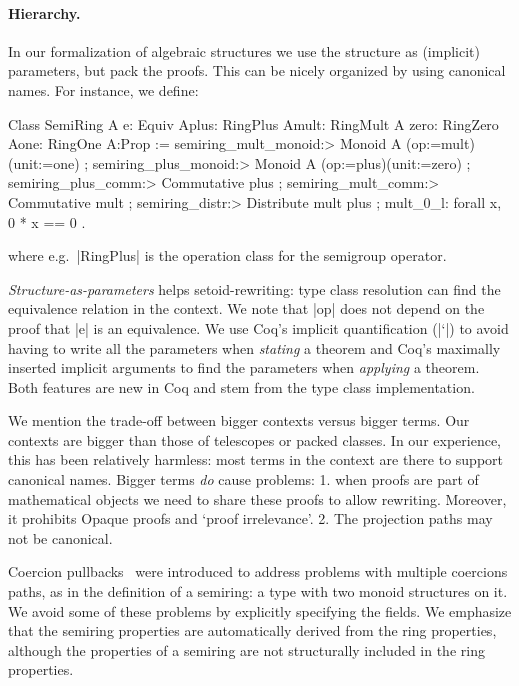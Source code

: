 \documentclass{llncs}
\begin{document}
\paragraph{Hierarchy.}\label{hierarchy}
In our formalization of algebraic structures we use the structure as (implicit) parameters, but
pack the proofs. This can be nicely organized by using canonical names. For instance, we define:
\begin{code}
Class SemiRing A {e: Equiv A}{plus: RingPlus A}{mult: RingMult A}
                 {zero: RingZero A}{one: RingOne A}:Prop :=
  { semiring_mult_monoid:> Monoid A (op:=mult)(unit:=one)
  ; semiring_plus_monoid:> Monoid A (op:=plus)(unit:=zero)
  ; semiring_plus_comm:> Commutative plus
  ; semiring_mult_comm:> Commutative mult
  ; semiring_distr:> Distribute mult plus
  ; mult_0_l: forall x, 0 * x == 0 }.
\end{code}
where e.g.\ |RingPlus| is the operation class for the semigroup operator.

\emph{Structure-as-parameters} helps setoid-rewriting: type class resolution
can find the equivalence relation in the context.
We note that |op| does not depend on the proof that |e| is an equivalence. We use Coq's implicit
quantification (|`{}|) to avoid having to write all the parameters when \emph{stating} a theorem
and Coq's maximally inserted implicit arguments to find the parameters when \emph{applying} a
theorem. Both features are new in Coq and stem from the type class implementation.

We mention the trade-off between bigger contexts versus bigger terms. Our contexts are bigger than
those of telescopes or packed classes. In our experience, this has been relatively harmless: most
terms in the context are there to support canonical names. Bigger terms
\emph{do} cause problems: 1. when proofs are part of mathematical objects we need to share these
proofs to allow rewriting. Moreover, it prohibits Opaque proofs and `proof irrelevance'. 2. The
projection paths may not be canonical.

Coercion pullbacks~\cite{Hints} were introduced to address problems with multiple coercions paths,
as in the definition of a semiring: a type with two monoid structures on it. We avoid some
of these problems by explicitly specifying the fields. We emphasize that the semiring properties are automatically derived from the ring
properties, although the properties of a semiring are not structurally included in the ring
properties.
\end{document}
